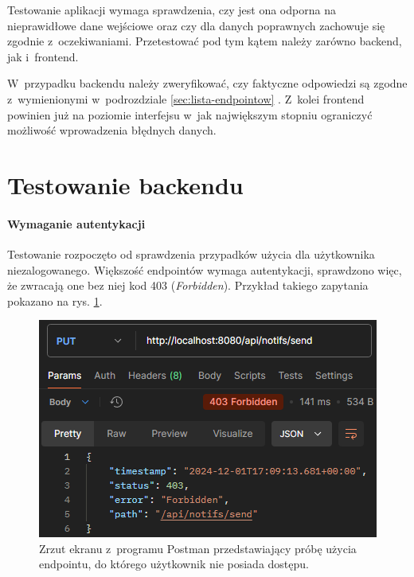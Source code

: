 \documentclass[a4paper,twoside,12pt]{book}
\newcommand{\obcy}[1]{\emph{#1}}
\newcommand{\english}[1]{{\selectlanguage{british}\obcy{#1}}}
\begin{document}
Testowanie aplikacji wymaga sprawdzenia, czy jest ona odporna na nieprawidłowe dane wejściowe oraz czy dla danych poprawnych zachowuje się zgodnie z~oczekiwaniami. Przetestować pod tym kątem należy zarówno backend, jak i~frontend.

W~przypadku backendu należy zweryfikować, czy faktyczne odpowiedzi są zgodne z~wymienionymi w~podrozdziale \ref{sec:lista-endpointow} . Z~kolei frontend powinien już na poziomie interfejsu w~jak największym stopniu ograniczyć możliwość wprowadzenia błędnych danych.

\section{Testowanie backendu}

\paragraph{Wymaganie autentykacji}
Testowanie rozpoczęto od sprawdzenia przypadków użycia dla użytkownika niezalogowanego. Większość endpointów wymaga autentykacji, sprawdzono więc, że zwracają one bez niej kod 403 (\english{Forbidden}). Przykład takiego zapytania pokazano na rys. \ref{fig:send-notifs-403}.

\begin{figure}
\centering
\includegraphics[width=\textwidth]{./SendNotifs403.png}
\caption{Zrzut ekranu z~programu Postman przedstawiający próbę użycia endpointu, do którego użytkownik nie posiada dostępu.}
\label{fig:send-notifs-403}
\end{figure}
\end{document}
